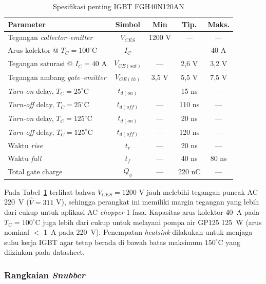 \begin{table}[H]
  \centering
  \caption{Spesifikasi penting IGBT FGH40N120AN}
  \label{tab:spesifikasi-igbt}
  \begin{tabular}{|p{5cm}|c|c|c|c|}
  \hline
  \textbf{Parameter} & \textbf{Simbol} & \textbf{Min} & \textbf{Tip.} & \textbf{Maks.} \\
  \hline
  Tegangan \emph{collector--emitter} & $V_{CES}$ & 1200 V & --- & --- \\
  \hline
  Arus kolektor @ $T_C = 100^{\circ}$C & $I_C$ & --- & --- & 40 A \\
  \hline
  Tegangan saturasi @ $I_C = 40$ A & $V_{CE(sat)}$ & --- & 2,6 V & 3,2 V \\
  \hline
  Tegangan ambang \emph{gate--emitter} & $V_{GE(th)}$ & 3,5 V & 5,5 V & 7,5 V \\
  \hline
  \emph{Turn-on} delay, $T_C = 25^{\circ}$C & $t_{d(on)}$ & --- & 15 ns & --- \\
  \hline
  \emph{Turn-off} delay, $T_C = 25^{\circ}$C & $t_{d(off)}$ & --- & 110 ns & --- \\
  \hline
  \emph{Turn-on} delay, $T_C = 125^{\circ}$C & $t_{d(on)}$ & --- & 20 ns & --- \\
  \hline
  \emph{Turn-off} delay, $T_C = 125^{\circ}$C & $t_{d(off)}$ & --- & 120 ns & --- \\
  \hline
  Waktu \emph{rise} & $t_r$ & --- & 20 ns & --- \\
  \hline
  Waktu \emph{fall} & $t_f$ & --- & 40 ns & 80 ns \\
  \hline
  Total gate charge & $Q_g$ & --- & 220 nC & --- \\
  \hline
  \end{tabular}
\end{table}

Pada Tabel~\ref{tab:spesifikasi-igbt} terlihat bahwa
$V_{CES} = 1200$ V jauh melebihi tegangan puncak AC 220~V
($\hat{V} = 311$ V), sehingga perangkat ini memiliki margin
tegangan yang lebih dari cukup untuk aplikasi AC \emph{chopper}
1 fasa. Kapasitas arus kolektor 40~A pada $T_C = 100^{\circ}$C
juga lebih dari cukup untuk melayani pompa air GP125 125~W
(arus nominal $<$ 1~A pada 220~V). Penempatan \emph{heatsink}
dilakukan untuk menjaga suhu kerja IGBT agar tetap berada di
bawah batas maksimum $150^{\circ}$C yang diizinkan pada
datasheet.

\subsubsection{Rangkaian \emph{Snubber}}
\label{sec:penentuan-snubber}

